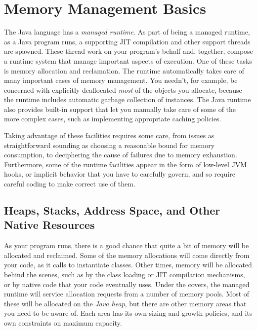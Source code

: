 
\chapter{Memory Management Basics}

The Java language has a \emph{managed runtime}. As part
of being a managed runtime, as a Java program runs, a supporting JIT compilation
and other support threads are spawned. These thread work on your program's
behalf and, together, compose a runtime system that manage important aspects of
execution. One of these tasks is memory allocation and reclamation. The runtime
automatically takes care of many important cases of memory management. You
needn't, for example, be concerned with explicitly deallocated \emph{most} of
the objects you allocate, because the runtime includes automatic garbage
collection of instances. The Java runtime also provides built-in support that
let you manually take care of some of the more complex cases, such as
implementing appropriate caching policies.

Taking advantage of these facilities requires some care, from issues as
straightforward sounding as choosing a reasonable bound for memory consumption,
to deciphering the cause of failures due to memory exhaustion. Furthermore, some
of the runtime facilities appear in the form of low-level JVM hooks, or implicit
behavior that you have to carefully govern, and so require careful coding to
make correct use of them.

\section{Heaps, Stacks, Address Space, and Other Native Resources}

As your program runs, there is a good chance that quite a bit of memory will be
allocated and reclaimed. Some of the memory allocations will come directly from
your code, as it calls  to instantiate classes. Other times, memory
will be allocated behind the scenes, such as by the class loading or JIT
compilation mechanisms, or by native code that your code eventually uses. Under
the covers, the managed runtime will service allocation requests from a number
of memory pools. Most of these will be allocated on the \emph{Java heap}, but
there are other memory areas that you need to be aware of. Each area has its own
sizing and growth policies, and its own constraints on maximum capacity.

